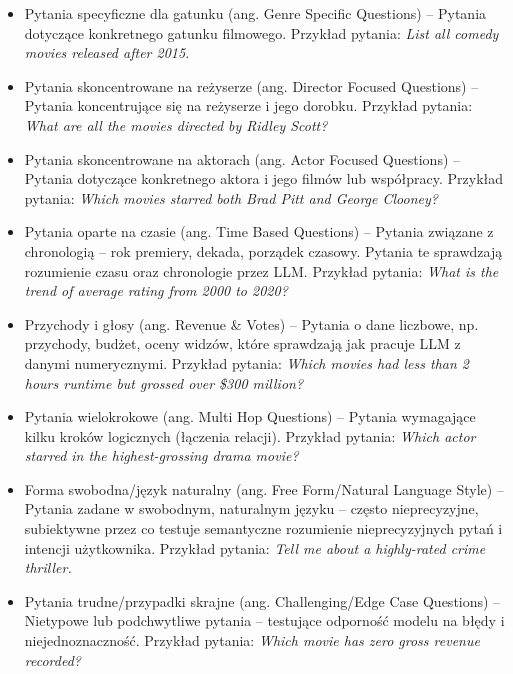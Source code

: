 \documentclass[
a4paper,
12pt,
]{article}
\begin{document}
\begin{itemize}
    \item Pytania specyficzne dla gatunku (ang. Genre Specific Questions) -- Pytania dotyczące konkretnego gatunku filmowego.
    Przykład pytania: 
    \textit{List all comedy movies released after 2015.}

    \item Pytania skoncentrowane na reżyserze (ang. Director Focused Questions) -- Pytania koncentrujące się na reżyserze i jego dorobku.
    Przykład pytania: 
    \textit{What are all the movies directed by Ridley Scott?}

    \item Pytania skoncentrowane na aktorach (ang. Actor Focused Questions) -- Pytania dotyczące konkretnego aktora i jego filmów lub współpracy.   
    Przykład pytania: 
    \textit{Which movies starred both Brad Pitt and George Clooney?}

    \item Pytania oparte na czasie (ang. Time Based Questions) -- Pytania związane z chronologią -- rok premiery, dekada, porządek czasowy.  Pytania te sprawdzają rozumienie czasu oraz chronologie przez LLM. 
    Przykład pytania: 
    \textit{What is the trend of average rating from 2000 to 2020?}

    \item Przychody i głosy (ang. Revenue \& Votes) -- Pytania o dane liczbowe, np. przychody, budżet, oceny widzów, które sprawdzają jak pracuje LLM z danymi numerycznymi.
    Przykład pytania: 
    \textit{Which movies had less than 2 hours runtime but grossed over \$300 million?}

    \item Pytania wielokrokowe (ang. Multi Hop Questions) -- Pytania wymagające kilku kroków logicznych (łączenia relacji).
    Przykład pytania: 
    \textit{Which actor starred in the highest-grossing drama movie?}

    \item Forma swobodna/język naturalny (ang. Free Form/Natural Language Style) -- Pytania zadane w swobodnym, naturalnym języku -- często nieprecyzyjne, subiektywne przez co testuje semantyczne rozumienie nieprecyzyjnych pytań i intencji użytkownika.
    Przykład pytania: 
    \textit{Tell me about a highly-rated crime thriller.}

    \item Pytania trudne/przypadki skrajne (ang. Challenging/Edge Case Questions) -- Nietypowe lub podchwytliwe pytania -- testujące odporność modelu na błędy i niejednoznaczność.
    Przykład pytania: 
    \textit{Which movie has zero gross revenue recorded?}


\end{itemize}
\end{document}
